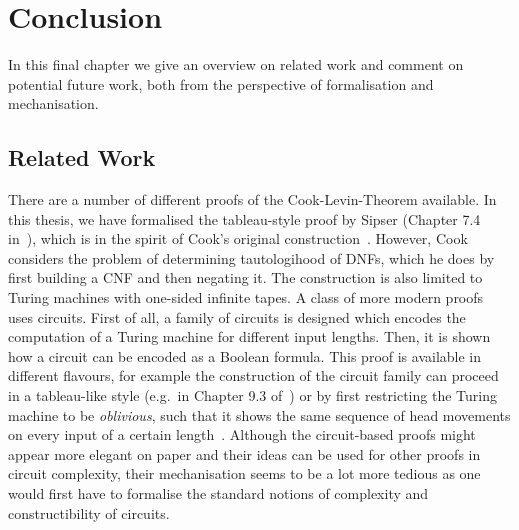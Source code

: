 \chapter{Conclusion}\label{chap:conclusion}
In this final chapter we give an overview on related work and comment on potential future work, both from the perspective of formalisation and mechanisation.

\section{Related Work}
There are a number of different proofs of the Cook-Levin-Theorem available. In this thesis, we have formalised the tableau-style proof by Sipser (Chapter 7.4 in~\cite{Sipser:TheoryofComputation}), which is in the spirit of Cook's original construction~\cite{cook_theorem}. However, Cook considers the problem of determining tautologihood of DNFs, which he does by first building a CNF and then negating it. The construction is also limited to Turing machines with one-sided infinite tapes.
A class of more modern proofs uses circuits. First of all, a family of circuits is designed which encodes the computation of a Turing machine for different input lengths. Then, it is shown how a circuit can be encoded as a Boolean formula. This proof is available in different flavours, for example the construction of the circuit family can proceed in a tableau-like style (e.g.\ in Chapter 9.3 of~\cite{Sipser:TheoryofComputation}) or by first restricting the Turing machine to be \emph{oblivious}, such that it shows the same sequence of head movements on every input of a certain length~\cite{Bläser:TISkript}. 
Although the circuit-based proofs might appear more elegant on paper and their ideas can be used for other proofs in circuit complexity, their mechanisation seems to be a lot more tedious as one would first have to formalise the standard notions of complexity and constructibility of circuits. 

